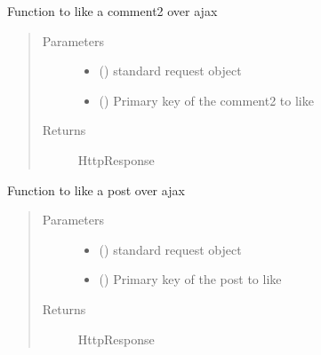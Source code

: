 \documentclass[letterpaper,10pt,english]{sphinxmanual}
\begin{document}

\begin{fulllineitems}
\label{\detokenize{forums:forums.views.like_comment2}}
Function to like a comment2 over ajax
\begin{quote}\begin{description}
\item[{Parameters}] \leavevmode\begin{itemize}
\item {} 
 () \textendash{} standard request object

\item {} 
 () \textendash{} Primary key of the comment2 to like

\end{itemize}

\item[{Returns}] \leavevmode
HttpResponse

\end{description}\end{quote}

\end{fulllineitems}


\begin{fulllineitems}
\label{\detokenize{forums:forums.views.like_post}}
Function to like a post over ajax
\begin{quote}\begin{description}
\item[{Parameters}] \leavevmode\begin{itemize}
\item {} 
 () \textendash{} standard request object

\item {} 
 () \textendash{} Primary key of the post to like

\end{itemize}

\item[{Returns}] \leavevmode
HttpResponse

\end{description}\end{quote}

\end{fulllineitems}
\end{document}
